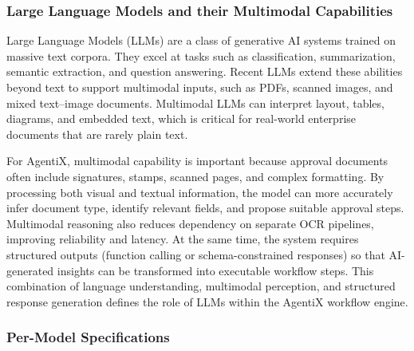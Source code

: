 \documentclass[12pt,oneside,openright,a4paper]{cpe-english-project}
\begin{document}
\subsubsection{Large Language Models and their Multimodal Capabilities}

Large Language Models (LLMs) are a class of generative AI systems trained
on massive text corpora. They excel at tasks such as classification,
summarization, semantic extraction, and question answering. Recent LLMs
extend these abilities beyond text to support multimodal inputs, such as
PDFs, scanned images, and mixed text–image documents. Multimodal LLMs can
interpret layout, tables, diagrams, and embedded text, which is critical
for real-world enterprise documents that are rarely plain text.

For AgentiX, multimodal capability is important because approval
documents often include signatures, stamps, scanned pages, and complex
formatting. By processing both visual and textual information, the model
can more accurately infer document type, identify relevant fields, and
propose suitable approval steps. Multimodal reasoning also reduces
dependency on separate OCR pipelines, improving reliability and
latency. At the same time, the system requires structured outputs
(function calling or schema-constrained responses) so that AI-generated
insights can be transformed into executable workflow steps. This
combination of language understanding, multimodal perception, and
structured response generation defines the role of LLMs within the
AgentiX workflow engine.

\subsubsection{Per-Model Specifications}
\end{document}
